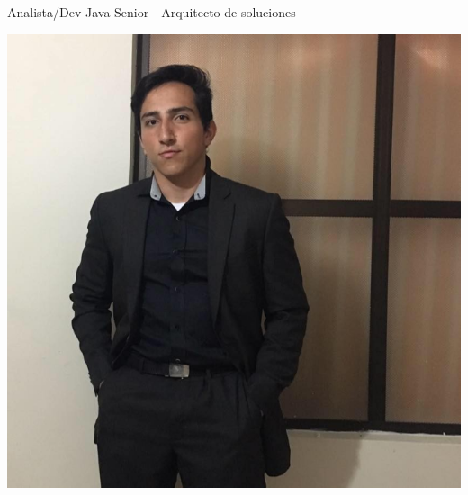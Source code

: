 \documentclass[]{cv-class}
\begin{document}
{Analista/Dev Java Senior - Arquitecto de soluciones }

\vspace{1.15cm}

\begin{aside}
	\includegraphics[scale=0.15]{img/indice.png}
	~
	\vspace{0.35cm}

\end{aside}
\end{document}
